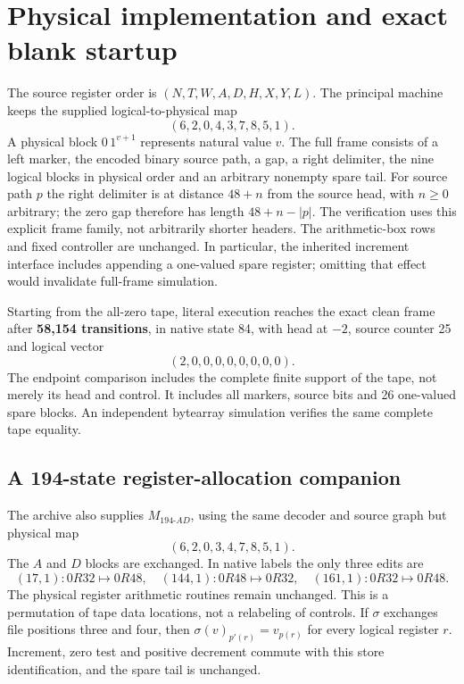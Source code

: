 \documentclass[11pt,letterpaper]{article}
\newcommand{\MAD}{M_{194\text{-}AD}}
\begin{document}
\section{Physical implementation and exact blank startup}
\label{sec:physical}

The source register order is $(N,T,W,A,D,H,X,Y,L)$. The principal machine
keeps the supplied logical-to-physical map
\[
                        (6,2,0,4,3,7,8,5,1).
\]
A physical block $0\,1^{v+1}$ represents natural value $v$.
The full frame consists of a left marker, the encoded binary source path,
a gap, a right delimiter, the nine logical blocks in physical order and
an arbitrary nonempty spare tail. For source path $p$ the right delimiter
is at distance $48+n$ from the source head, with $n\ge0$ arbitrary; the
zero gap therefore has length $48+n-|p|$. The verification uses this
explicit frame family, not arbitrarily shorter headers. The arithmetic-box rows and fixed
controller are unchanged. In particular, the inherited increment
interface includes appending a one-valued spare register; omitting that
effect would invalidate full-frame simulation.

Starting from the all-zero tape, literal execution reaches the exact clean
frame after \textbf{58,154 transitions}, in native state 84, with head at
$-2$, source counter 25 and logical vector
\[
                         (2,0,0,0,0,0,0,0,0).
\]
The endpoint comparison includes the complete finite support of the tape,
not merely its head and control. It includes all markers, source bits and
26 one-valued spare blocks. An independent bytearray simulation verifies
the same complete tape equality.

\subsection{A 194-state register-allocation companion}

The archive also supplies $\MAD$, using the same decoder and source graph
but physical map
\[
                        (6,2,0,3,4,7,8,5,1).
\]
The $A$ and $D$ blocks are exchanged. In native labels the only three
edits are
\[
 (17,1):0R32\mapsto0R48,\quad
 (144,1):0R48\mapsto0R32,\quad
 (161,1):0R32\mapsto0R48.
\]
The physical register arithmetic routines remain unchanged. This is a
permutation of tape data locations, not a relabeling of controls. If
$\sigma$ exchanges file positions three and four, then
$\sigma(v)_{p'(r)}=v_{p(r)}$ for every logical register $r$.
Increment, zero test and positive decrement commute with this store
identification, and the spare tail is unchanged.
\end{document}
